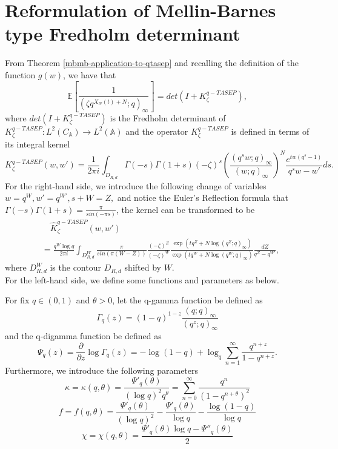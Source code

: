 \section{Reformulation of Mellin-Barnes type Fredholm determinant}
From Theorem \ref{mbmb-application-to-qtasep} and recalling the definition of the function $g(w)$, we have that $$\mathbb{E} \left[ \frac{1}{(\zeta q^{X_N(t)+N}; q)_{\infty}} \right] = det(I+K_{\zeta}^{q-TASEP}),$$where $det(I+K_{\zeta}^{q-TASEP})$ is the Fredholm determinant of $K_{\zeta}^{q-TASEP}: L^2(C_{\mathbb{A}}) \rightarrow L^2(\mathbb{A})$ and the operator $K_{\zeta}^{q-TASEP}$ is defined in terms of its integral kernel
$$K_{\zeta}^{q-TASEP}(w,w') = \frac{1}{2 \pi i} \int_{D_{R,d}} \Gamma(-s) \Gamma(1+s) (-\zeta)^s \left(\frac{(q^s w; q)_{\infty}}{(w;q)_{\infty}}\right)^N \frac{e^{tw(q^s-1)}}{q^sw - w'} ds.$$
For the right-hand side, we introduce the following change of variables $w = q^W, w' = q^{W'}, s+W = Z,$ and notice the Euler's Reflection formula that $\Gamma(-s) \Gamma(1+s) = \frac{\pi}{sin(-\pi s)}$, the kernel can be transformed to be 
\begin{align*}
& \quad \hat{K}_{\zeta}^{q-TASEP}(w,w') \\
& = \frac{q^W \log q}{2 \pi i} \int_{D^W_{R,d}} \frac{\pi}{sin(\pi (W-Z))} \frac{(-\zeta)^Z}{(-\zeta)^W} \frac{\exp(tq^Z+N\log(q^Z;q)_{\infty})}{\exp(tq^W+N\log(q^W;q)_{\infty})} \frac{dZ}{q^Z - q^{W'}},
\end{align*}
where $D^W_{R,d}$ is the contour $D_{R,d}$ shifted by $W$.\\

For the left-hand side, we define some functions and parameters as below.
\begin{definition}
For fix $q \in (0,1)$ and $\theta > 0$, let the q-gamma function be defined as $$\Gamma_q(z) = (1-q)^{1-z} \frac{(q;q)_{\infty}}{(q^z;q)_{\infty}}$$ and the q-digamma function be defined as $$\Psi_q(z) = \frac{\partial}{\partial z} \log \Gamma_q(z) = -\log(1-q) + \log_q \sum_{n=1}^{\infty} \frac{q^{n+z}}{1 - q^{n+z}}.$$
Furthermore, we introduce the following parameters
\begin{equation*}
\kappa = \kappa(q,\theta) = \frac{\Psi'_q(\theta)}{(\log q)^2 q^{\theta}} = \sum_{n=0}^{\infty} \frac{q^n}{(1-q^{n+\theta})^2}
\end{equation*}
\begin{equation*}
f = f(q,\theta) = \frac{\Psi'_q(\theta)}{(\log q)^2} - \frac{\Psi'_q(\theta)}{\log q} - \frac{\log(1-q)}{\log q}
\end{equation*}
\begin{equation*}
\chi = \chi(q,\theta) = \frac{\Psi'_q(\theta) \log q - \Psi''_q(\theta)}{2}
\end{equation*}
\end{definition}

